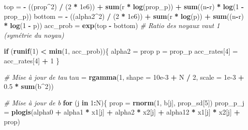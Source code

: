 \documentclass[
]{article}
\newenvironment{Shaded}{\begin{snugshade}}{\end{snugshade}}
\newcommand{\AttributeTok}[1]{\textcolor[rgb]{0.13,0.29,0.53}{#1}}
\newcommand{\CommentTok}[1]{\textcolor[rgb]{0.56,0.35,0.01}{\textit{#1}}}
\newcommand{\ControlFlowTok}[1]{\textcolor[rgb]{0.13,0.29,0.53}{\textbf{#1}}}
\newcommand{\DecValTok}[1]{\textcolor[rgb]{0.00,0.00,0.81}{#1}}
\newcommand{\FloatTok}[1]{\textcolor[rgb]{0.00,0.00,0.81}{#1}}
\newcommand{\FunctionTok}[1]{\textcolor[rgb]{0.13,0.29,0.53}{\textbf{#1}}}
\newcommand{\NormalTok}[1]{#1}
\newcommand{\OtherTok}[1]{\textcolor[rgb]{0.56,0.35,0.01}{#1}}
\newcommand{\SpecialCharTok}[1]{\textcolor[rgb]{0.81,0.36,0.00}{\textbf{#1}}}
\begin{document}
\begin{Shaded}
\begin{Highlighting}[]
\NormalTok{    top }\OtherTok{=} \SpecialCharTok{{-}}\NormalTok{ ((prop}\SpecialCharTok{\^{}}\DecValTok{2}\NormalTok{) }\SpecialCharTok{/}\NormalTok{ (}\DecValTok{2} \SpecialCharTok{*} \FloatTok{1e6}\NormalTok{)) }\SpecialCharTok{+} \FunctionTok{sum}\NormalTok{(r }\SpecialCharTok{*} \FunctionTok{log}\NormalTok{(prop\_p)) }\SpecialCharTok{+} \FunctionTok{sum}\NormalTok{((n}\SpecialCharTok{{-}}\NormalTok{r) }\SpecialCharTok{*} \FunctionTok{log}\NormalTok{(}\DecValTok{1} \SpecialCharTok{{-}}\NormalTok{ prop\_p))}
\NormalTok{    bottom }\OtherTok{=} \SpecialCharTok{{-}}\NormalTok{ ((alpha2}\SpecialCharTok{\^{}}\DecValTok{2}\NormalTok{) }\SpecialCharTok{/}\NormalTok{ (}\DecValTok{2} \SpecialCharTok{*} \FloatTok{1e6}\NormalTok{)) }\SpecialCharTok{+} \FunctionTok{sum}\NormalTok{(r }\SpecialCharTok{*} \FunctionTok{log}\NormalTok{(p)) }\SpecialCharTok{+} \FunctionTok{sum}\NormalTok{((n}\SpecialCharTok{{-}}\NormalTok{r) }\SpecialCharTok{*} \FunctionTok{log}\NormalTok{(}\DecValTok{1} \SpecialCharTok{{-}}\NormalTok{ p))}
\NormalTok{    acc\_prob }\OtherTok{=} \FunctionTok{exp}\NormalTok{(top }\SpecialCharTok{{-}}\NormalTok{ bottom) }\CommentTok{\# Ratio des noyaux vaut 1 (symétrie du noyau)}
    
    \ControlFlowTok{if}\NormalTok{ (}\FunctionTok{runif}\NormalTok{(}\DecValTok{1}\NormalTok{) }\SpecialCharTok{\textless{}} \FunctionTok{min}\NormalTok{(}\DecValTok{1}\NormalTok{, acc\_prob))\{}
\NormalTok{      alpha2 }\OtherTok{=}\NormalTok{ prop}
\NormalTok{      p }\OtherTok{=}\NormalTok{ prop\_p}
\NormalTok{      acc\_rates[}\DecValTok{4}\NormalTok{] }\OtherTok{=}\NormalTok{ acc\_rates[}\DecValTok{4}\NormalTok{] }\SpecialCharTok{+} \DecValTok{1}
\NormalTok{    \}}
    
    \CommentTok{\# Mise à jour de tau}
\NormalTok{    tau }\OtherTok{=} \FunctionTok{rgamma}\NormalTok{(}\DecValTok{1}\NormalTok{, }\AttributeTok{shape =} \FloatTok{10e{-}3} \SpecialCharTok{+}\NormalTok{ N }\SpecialCharTok{/} \DecValTok{2}\NormalTok{, }\AttributeTok{scale =} \FloatTok{1e{-}3} \SpecialCharTok{+} \FloatTok{0.5} \SpecialCharTok{*} \FunctionTok{sum}\NormalTok{(b}\SpecialCharTok{\^{}}\DecValTok{2}\NormalTok{))}

    \CommentTok{\# Mise à jour de b}
    \ControlFlowTok{for}\NormalTok{ (j }\ControlFlowTok{in} \DecValTok{1}\SpecialCharTok{:}\NormalTok{N)\{}
\NormalTok{      prop }\OtherTok{=} \FunctionTok{rnorm}\NormalTok{(}\DecValTok{1}\NormalTok{, b[j], prop\_sd[}\DecValTok{5}\NormalTok{])}
\NormalTok{      prop\_p\_j }\OtherTok{=} \FunctionTok{plogis}\NormalTok{(alpha0 }\SpecialCharTok{+}\NormalTok{ alpha1 }\SpecialCharTok{*}\NormalTok{ x1[j] }\SpecialCharTok{+}\NormalTok{ alpha2 }\SpecialCharTok{*}\NormalTok{ x2[j] }\SpecialCharTok{+}\NormalTok{ alpha12 }\SpecialCharTok{*}\NormalTok{ x1[j] }\SpecialCharTok{*}\NormalTok{ x2[j] }\SpecialCharTok{+}\NormalTok{ prop)}
      

\end{Highlighting}
\end{Shaded}
\end{document}
